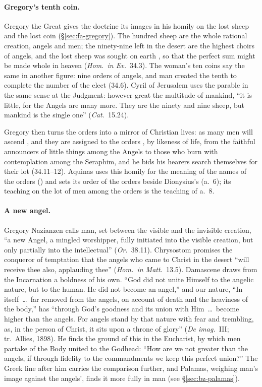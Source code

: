 \paragraph{Gregory's tenth coin.} Gregory the Great gives the doctrine its
images in his homily on the lost sheep and the lost coin
(\S\ref{sec:fa-gregory}). The hundred sheep are the whole
rational creation, angels and men; the ninety-nine left in the desert are
the highest choirs of angels, and the lost sheep was sought on earth
, so that the perfect
sum might be made whole in heaven (\emph{Hom.\ in Ev.}\ 34.3). The woman's
ten coins say the same in another figure: nine orders of angels, and man
created the tenth to complete the number of the elect (34.6). Cyril of Jerusalem uses the parable in the same sense at the
Judgment: however great the multitude of mankind, ``it is little, for the
Angels are many more. They are the ninety and nine sheep, but mankind is
the single one'' (\emph{Cat.}\ 15.24).

Gregory then turns the orders into a mirror of Christian lives: as many
men will ascend ,
and they are assigned to the orders , by likeness of life, from the faithful announcers of little
things among the Angels to those who burn with contemplation among the
Seraphim, and he bids his hearers search themselves for their lot
(34.11--12). Aquinas uses this homily for the meaning of the names of the orders
() and sets its order of the orders beside Dionysius's
(a.~6); its teaching on the lot of men among the orders is the teaching of
a.~8.

\paragraph{A new angel.} Gregory Nazianzen calls man, set between the
visible and the invisible creation, ``a new Angel, a mingled worshipper,
fully initiated into the visible creation, but only partially into the
intellectual'' (\emph{Or.}\ 38.11). Chrysostom promises the conqueror of
temptation that the angels who came to Christ in the desert ``will receive
thee also, applauding thee'' (\emph{Hom.\ in Matt.}\ 13.5). Damascene draws
from the Incarnation a boldness of his own. ``God did not unite Himself to
the angelic nature, but to the human. He did not become an angel,'' and our
nature, ``In itself~\dots\ far removed from the angels, on account of death
and the heaviness of the body,'' has ``through God's goodness and its union
with Him~\dots\ become higher than the angels. For angels stand by that
nature with fear and trembling, as, in the person of Christ, it sits upon a
throne of glory'' (\emph{De imag.}\ III; tr.\ Allies, 1898). He finds the
ground of this in the Eucharist, by which men partake of the Body united to
the Godhead: ``How are we not greater than the angels, if through fidelity
to the commandments we keep this perfect union?'' The Greek line after him
carries the comparison further, and Palamas, weighing man's image against
the angels', finds it more fully in man (see \S\ref{sec:bz-palamas}).

